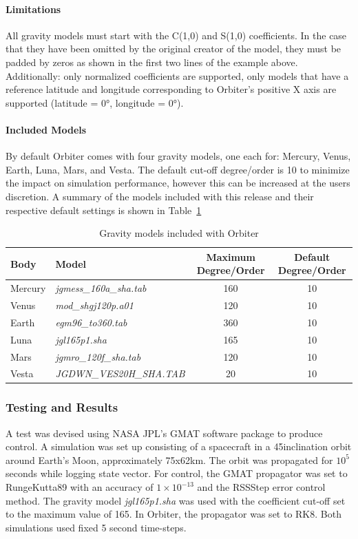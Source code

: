 \documentclass[Orbiter Technical Reference.tex]{subfiles}
\begin{document}
\paragraph{Limitations}
All gravity models must start with the C(1,0) and S(1,0) coefficients. In the case that they have been omitted by the original creator of the model, they must be padded by zeros as shown in the first two lines of the example above. Additionally: only normalized coefficients are supported, only models that have a reference latitude and longitude corresponding to Orbiter's positive X axis are supported (latitude = 0°, longitude = 0°).

\paragraph{Included Models}
By default Orbiter comes with four gravity models, one each for: Mercury, Venus, Earth, Luna, Mars, and Vesta. The default cut-off degree/order is 10 to minimize the impact on simulation performance, however this can be increased at the users discretion. A summary of the models included with this release and their respective default settings is shown in Table~\ref{tab:models}
\begin{table}[h]
\begin{tabular}{llcc}
Body    	& Model                 					& Maximum Degree/Order 		& Default Degree/Order \\\hline
Mercury 	& \emph{jgmess\_160a\_sha.tab} 		& 160                  			& 10                   \\
Venus   	& \emph{mod\_shgj120p.a01}     		& 120                  			& 10                   \\
Earth   	& \emph{egm96\_to360.tab}     			& 360                 			& 10                   \\
Luna    	& \emph{jgl165p1.sha}				& 165                  			& 10                   \\
Mars    	& \emph{jgmro\_120f\_sha.tab}  		& 120                  			& 10		     \\
Vesta    	& \emph{JGDWN\_VES20H\_SHA.TAB}		& 20                  			& 10
\end{tabular}
\caption{Gravity models included with Orbiter}
\label{tab:models}
\end{table}

\subsubsection{Testing and Results}
A test was devised using NASA JPL's GMAT software package to produce control. A simulation was set up consisting of a spacecraft in a 45\textdegree inclination orbit around Earth's Moon, approximately 75x62km. The orbit was propagated for $10^5$ seconds while logging state vector. For control, the GMAT propagator was set to RungeKutta89 with an accuracy of $1\times10^{-13}$ and the RSSStep error control method. The gravity model \emph{jgl165p1.sha} was used with the coefficient cut-off set to the maximum value of 165. In Orbiter, the propagator was set to RK8. Both simulations used fixed 5 second time-steps. 
\end{document}
